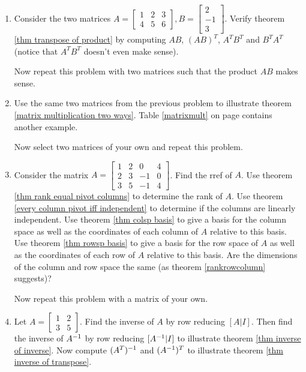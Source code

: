 \begin{enumerate}
\begin{enumerate}
	\item Consider the two matrices 
	$A=
	\begin{bmatrix}
	 1 & 2 & 3\\
	 4 & 5 & 6
	\end{bmatrix}
	, 
	B=
	\begin{bmatrix}
	 2\\-1\\3
	\end{bmatrix}$. Verify theorem \ref{thm transpose of product}  by computing $AB$, $(AB)^T$, $A^TB^T$ and $B^TA^T$ (notice that $A^TB^T$ doesn't even make sense). 
	
	Now repeat this problem with two matrices such that the product $AB$ makes sense.
	
	
	\item Use the same two matrices from the previous problem to illustrate theorem \ref{matrix multiplication two ways}. Table \ref{matrixmult} on page \pageref{matrixmult} contains another example.  
	
	Now select two matrices of your own and repeat this problem.
	
	
	
	\item Consider the matrix $A=\begin{bmatrix}
	1 & 2 & 0 & 4 \\
	2 & 3 & -1 & 0\\
	3 & 5 & -1 & 4	
	\end{bmatrix}$. Find the rref of $A$. Use theorem \ref{thm rank equal pivot columns} to determine the rank of $A$. Use theorem \ref{every column pivot iff independent} to determine if the columns are linearly independent. Use theorem \ref{thm colsp basis} to give a basis for the column space as well as the coordinates of each column of $A$ relative to this basis.  Use theorem \ref{thm rowsp basis} to give a basis for the row space of $A$ as well as the coordinates of each row of $A$ relative to this basis. Are the dimensions of the column and row space the same (as theorem \ref{rankrowcolumn} suggests)? 
	
	Now repeat this problem with a matrix of your own. 
	
  \item Let 
  $A=\begin{bmatrix}
	1 & 2 \\
	3 & 5
	\end{bmatrix}$.  
	Find the inverse of $A$ by row reducing $[A|I]$.  
	Then find the inverse of $A^{-1}$ by row reducing $[A^{-1}|I]$ to illustrate theorem \ref{thm inverse of inverse}.  
	Now compute $(A^T)^{-1}$ and $(A^{-1})^T$ to illustrate theorem \ref{thm inverse of transpose}.
	

\end{enumerate}
\end{enumerate}
